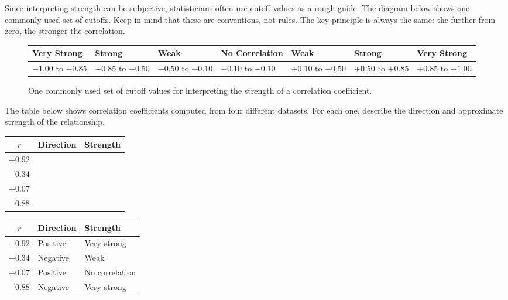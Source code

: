 Since interpreting strength can be subjective, statisticians often use
cutoff values as a rough guide. The diagram below shows one commonly
used set of cutoffs. Keep in mind that these are conventions, not
rules. The key principle is always the same: the further from zero,
the stronger the correlation.

\begin{figure}[H]
    \centering
    \begin{tabular}{|>{\centering\arraybackslash}p{1.9cm}|>{\centering\arraybackslash}p{1.9cm}|>{\centering\arraybackslash}p{1.9cm}|>{\centering\arraybackslash}p{2.4cm}|>{\centering\arraybackslash}p{1.9cm}|>{\centering\arraybackslash}p{1.9cm}|>{\centering\arraybackslash}p{1.9cm}|}
        \hline
        Very Strong & Strong & Weak & No Correlation & Weak & Strong & Very Strong \\
        \hline
        $-1.00$ to $-0.85$ & $-0.85$ to $-0.50$ & $-0.50$ to $-0.10$ & $-0.10$ to $+0.10$ & $+0.10$ to $+0.50$ & $+0.50$ to $+0.85$ & $+0.85$ to $+1.00$ \\
        \hline
    \end{tabular}
    \caption{One commonly used set of cutoff values for interpreting
    the strength of a correlation coefficient.}
    \label{fig:strengthcutoffs}
\end{figure}

\begin{Exercise}[title={Interpreting Strength}, label={ex:strength}]
The table below shows correlation coefficients computed from four
different datasets. For each one, describe the direction and
approximate strength of the relationship.
\begin{tabular}{|c|p{3.5cm}|p{3.5cm}|}
\hline
$r$ & Direction & Strength \\
\hline
$+0.92$ & & \\
\hline
$-0.34$ & & \\
\hline
$+0.07$ & & \\
\hline
$-0.88$ & & \\
\hline
\end{tabular}
\end{Exercise}

\begin{Answer}[ref={ex:strength}]
\begin{tabular}{|c|p{3.5cm}|p{3.5cm}|}
\hline
$r$ & Direction & Strength \\
\hline
$+0.92$ & Positive & Very strong \\
\hline
$-0.34$ & Negative & Weak \\
\hline
$+0.07$ & Positive & No correlation \\
\hline
$-0.88$ & Negative & Very strong \\
\hline
\end{tabular}
\end{Answer}

